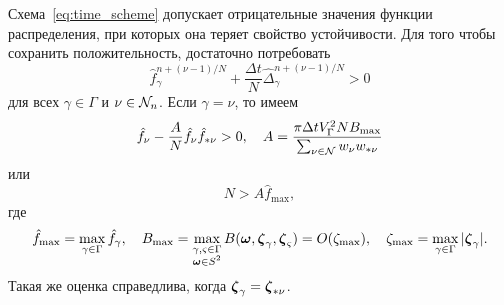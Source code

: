 Схема~\eqref{eq:time_scheme} допускает отрицательные значения функции распределения,
при которых она теряет свойство устойчивости.
Для того чтобы сохранить положительность, достаточно потребовать
\begin{equation}\label{eq:positive_f}
    \hat{f}_\gamma^{n+(\nu-1)/N} + \frac{\Delta{t}}N \hat{\Delta}_\gamma^{n+(\nu-1)/N} > 0
\end{equation}
для всех \(\gamma\in\Gamma\) и \(\nu\in\mathcal{N}_n\).
Если \(\gamma = \nu\), то имеем
\begin{equation}\label{eq:positive_f_alpha}
    \hat{f}_{\nu} - \frac{A}{N}\hat{f}_{\nu}\hat{f}_{*\nu} > 0, \quad
    A = \frac{\pi\Delta{t} V_\Gamma^2 N B_{\max}}{\sum_{\nu\in\mathcal{N}} w_{\nu}w_{*\nu}}
\end{equation}
или
\begin{equation}\label{eq:positive_f_alpha2}
    N > A \hat{f}_{\max},
\end{equation}
где
\begin{equation}\label{eq:f_B_max}
    \hat{f}_{\max} = \max_{\gamma\in\Gamma} \hat{f}_\gamma, \quad
    B_{\max} = \max_{\substack{\gamma,\varsigma\in\Gamma\\\boldsymbol{\omega}\in S^2}}
        B(\boldsymbol{\omega}, {\boldsymbol{\zeta}}_{\gamma}, {\boldsymbol{\zeta}}_{\varsigma}) = O(\zeta_{\max}), \quad
    \zeta_{\max} = \max_{\gamma\in\Gamma}|{\boldsymbol{\zeta}}_\gamma|.
\end{equation}
Такая же оценка справедлива, когда \({\boldsymbol{\zeta}}_\gamma = {\boldsymbol{\zeta}}_{*\nu}\).

